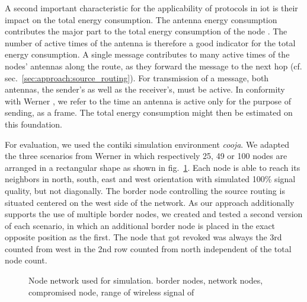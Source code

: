 \documentclass[conference]{IEEEtran}
\begin{document}
A second important characteristic for the applicability of protocols in \ac{iot} is their impact on the total energy consumption. 
The antenna energy consumption contributes the major part to the total energy consumption of the node \cite{dunkels2007software}.
The number of active times of the antenna is therefore a good indicator for the total energy consumption. 
A single message contributes to many active times of the nodes' antennas along the route, as they forward the message to the next hop (cf. sec.~\ref{sec:approach:source_routing}). 
For transmission of a message, both antennas, the sender's as well as the receiver's, must be active. 
In conformity with Werner \cite{DanielWerner}, we refer to the time an antenna is active only for the purpose of sending, as a frame. 
The total energy consumption might then be estimated on this foundation.

For evaluation, we used the contiki simulation environment \textit{cooja}. 
We adapted the three scenarios from Werner \cite{DanielWerner} in which respectively 25, 49 or 100 nodes are arranged in a rectangular shape as shown in fig.~\ref{fig:node_network}. 
Each node is able to reach its neighbors in north, south, east and west orientation with simulated 100\% signal quality, but not diagonally.
The border node controlling the source routing is situated centered on the west side of the network. 
As our approach additionally supports the use of multiple border nodes, we created and tested a second version of each scenario, in which an additional border node is placed in the exact opposite position as the first. 
The node that got revoked was always the 3rd counted from west in the 2nd row counted from north independent of the total node count.

\begin{figure}[t]
	\centering
	
	\caption{Node network used for simulation. 
		\protect{} border nodes, 
		\protect{} network nodes, 
		\protect{} compromised node, 
		\protect{} range of wireless signal of \protect{}}
	\label{fig:node_network}
\end{figure}
\end{document}
